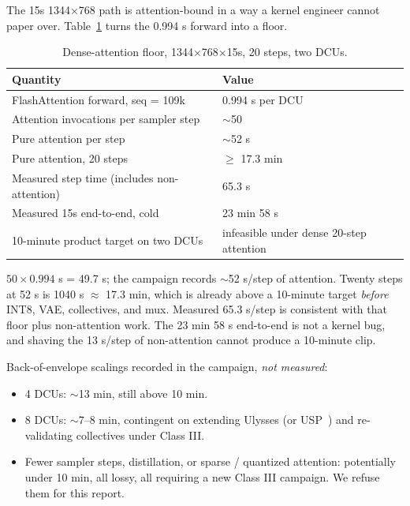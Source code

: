 \documentclass[11pt]{article}
\begin{document}
The 15s 1344$\times$768 path is attention-bound in a way a kernel engineer cannot paper over. Table~\ref{tab:bound} turns the 0.994 s forward into a floor.

\begin{table}[htbp]
\centering
\caption{\texorpdfstring{Dense-attention floor, 1344$\times$768$\times$15s, 20 steps, two DCUs.}{Dense-attention floor, 1344x768x15s, 20 steps, two DCUs.}}
\label{tab:bound}
\begin{tabular}{ll}
\toprule
Quantity & Value \\
\midrule
FlashAttention forward, seq = 109k & 0.994 s per DCU \\
Attention invocations per sampler step & $\sim$50 \\
Pure attention per step & $\sim$52 s \\
Pure attention, 20 steps & $\geq$ 17.3 min \\
Measured step time (includes non-attention) & 65.3 s \\
Measured 15s end-to-end, cold & 23 min 58 s \\
10-minute product target on two DCUs & infeasible under dense 20-step attention \\
\bottomrule
\end{tabular}
\end{table}

$50 \times 0.994$ s = 49.7 s; the campaign records $\sim$52 s/step of attention. Twenty steps at 52 s is 1040 s $\approx$ 17.3 min, which is already above a 10-minute target \emph{before} INT8, VAE, collectives, and mux. Measured 65.3 s/step is consistent with that floor plus non-attention work. The 23 min 58 s end-to-end is not a kernel bug, and shaving the 13 s/step of non-attention cannot produce a 10-minute clip.

Back-of-envelope scalings recorded in the campaign, \emph{not measured}:

\begin{itemize}
\item 4 DCUs: $\sim$13 min, still above 10 min.
\item 8 DCUs: $\sim$7--8 min, contingent on extending Ulysses (or USP~\cite{1}) and re-validating collectives under Class III.
\item Fewer sampler steps, distillation, or sparse / quantized attention: potentially under 10 min, all lossy, all requiring a new Class III campaign. We refuse them for this report.
\end{itemize}
\end{document}
